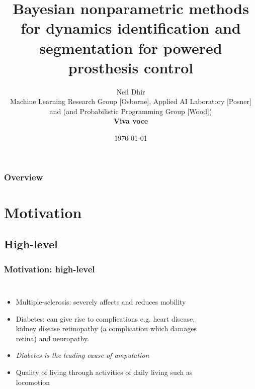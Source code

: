 \documentclass[aspectratio=169]{beamer}
\title[Nonparametrics]{Bayesian nonparametric methods for dynamics identification and segmentation for powered
prosthesis control}
\author
{\texorpdfstring{
        Neil Dhir  \\
        \footnotesize Machine Learning Research Group [Osborne], Applied AI Laboratory [Posner] and (and Probabilistic Programming Group
        [Wood])
        \vspace{1.5cm}\\
        {\bfseries{Viva voce}}
    }%
    {} 
\date{\today}} %
\begin{document}
\begin{frame}
    \titlepage %
\end{frame}

\begin{frame}
    \frametitle{Overview} %
    \tableofcontents %
\end{frame}


\section{Motivation}

\begin{frame}[plain]
    \subsection{High-level}
    \frametitle{Motivation: high-level}
    \begin{columns}[t] %

        \begin{itemize}
            \item Multiple-sclerosis: severely affects and reduces mobility 
            \item Diabetes: can give rise to complications e.g. heart disease, kidney disease
                retinopathy (a complication which damages retina) and neuropathy. 
            \item {\it Diabetes is the leading cause of amputation} 
            \item Quality of living through activities of daily living such as locomotion
        \end{itemize}
        \begin{figure}[ht]
            \\[-0em]
        \end{figure}
    \end{columns}
\end{frame}
\end{document}
